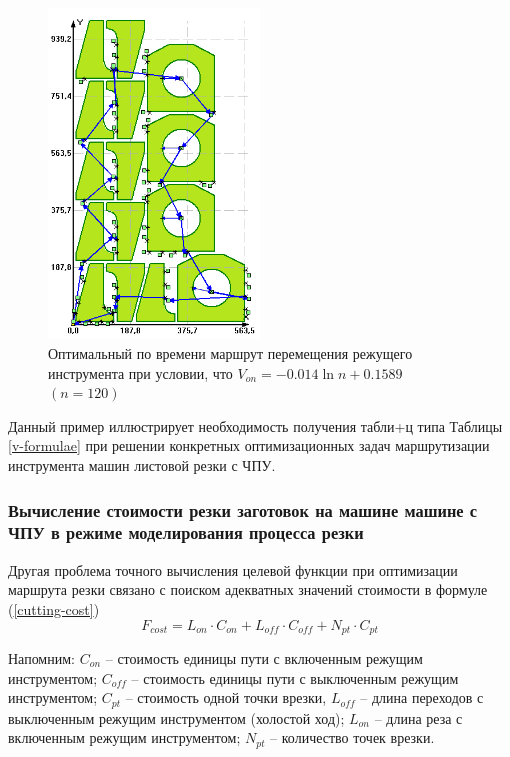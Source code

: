 \documentclass{article}
\begin{document}
\begin{figure}
  \begin{center}
  \includegraphics[width=0.5\textwidth]{amg-optimal.png}
  \caption{Оптимальный по времени маршрут перемещения режущего инструмента при условии, что
  $V_{on}=-0.014 \ln n + 0.1589$
  $(n=120)$}
  \label{amg-optimal}
  \end{center}
\end{figure}

Данный пример иллюстрирует необходимость
получения табли+ц типа Таблицы \ref{v-formulae}
при решении конкретных оптимизационных задач
маршрутизации инструмента машин листовой резки с ЧПУ.

\subsubsection{Вычисление стоимости резки заготовок на машине машине с ЧПУ в режиме моделирования процесса резки}

Другая проблема точного вычисления целевой функции
при оптимизации маршрута резки связано
с поиском адекватных значений стоимости в формуле (\ref{cutting-cost})
$$
F_{cost}=
L_{on} \cdot C_{on} +
L_{off} \cdot C_{off} +
N_{pt} \cdot C_{pt}
$$

Напомним:
$C_{on}$ – стоимость единицы пути с включенным режущим инструментом;
$C_{off}$ – стоимость единицы пути с выключенным режущим инструментом;
$C_{pt}$ – стоимость одной точки врезки,
$L_{off}$ – длина переходов с выключенным режущим инструментом (холостой ход);
$L_{on}$ – длина реза с включенным режущим инструментом;
$N_{pt}$ – количество точек врезки.
\end{document}
